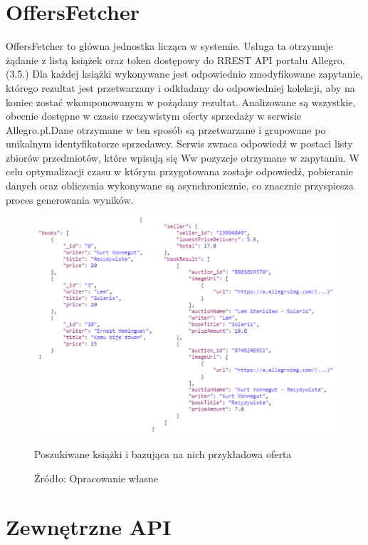 \section{OffersFetcher}
OffersFetcher to główna jednostka licząca w systemie. Usługa ta otrzymuje żądanie z listą książek oraz token dostępowy do RREST API portalu Allegro. (3.5.)
Dla każdej książki wykonywane jest odpowiednio zmodyfikowane zapytanie, którego rezultat jest przetwarzany i odkładany do odpowiedniej kolekcji, aby na koniec zostać wkomponowanym w pożądany rezultat. Analizowane są wszystkie, obecnie dostępne w czasie rzeczywistym oferty sprzedaży w serwisie Allegro.pl.Dane otrzymane w ten sposób są przetwarzane i grupowane po unikalnym identyfikatorze sprzedawcy. Serwis zwraca odpowiedź w postaci listy zbiorów przedmiotów, które wpisują się Ww pozyzcje otrzymane w zapytaniu. W celu optymalizacji czasu w którym przygotowana zostaje odpowiedź, pobieranie danych oraz obliczenia wykonywane są asynchronicznie, co znacznie przyspiesza proces generowania wyników.
\begin{figure}[H]
	\centering
	\includegraphics[width=\linewidth]{booksToOffers.pdf}
	\caption{Poszukiwane książki i bazująca na nich przykładowa oferta}
	\caption*{Źródło: {Opracowanie własne}}
\end{figure}

\section{Zewnętrzne API}

